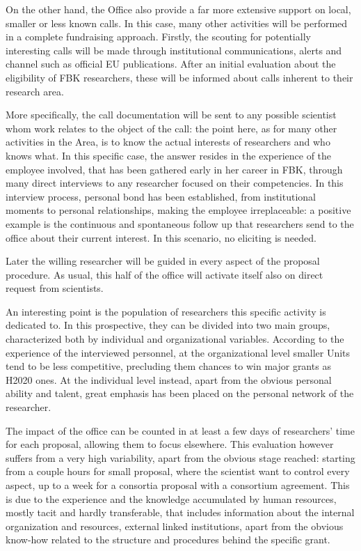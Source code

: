 On the other hand, the Office also provide a far more extensive support on local, smaller or less known calls. In this case, many other activities will be performed in a complete fundraising approach. Firstly, the scouting for potentially interesting calls will be made through institutional communications, alerts and channel such as official EU publications. After an initial evaluation about the eligibility of FBK researchers, these will be informed about calls inherent to their research area. 

More specifically, the call documentation will be sent to any possible scientist whom work relates to the object of the call: the point here, as for many other activities in the Area, is to know the actual interests of researchers and who knows what. In this specific case, the answer resides in the experience of the employee involved, that has been gathered early in her career in FBK, through many direct interviews to any researcher focused on their competencies. In this interview process, personal bond has been established, from institutional moments to personal relationships, making the employee irreplaceable: a positive example is the continuous and spontaneous follow up that researchers send to the office about their current interest. In this scenario, no eliciting is needed.

Later the willing researcher will be guided in every aspect of the proposal procedure. As usual, this half of the office will activate itself also on direct request from scientists. 

An interesting point is the population of researchers this specific activity is dedicated to. In this prospective, they can be divided into two main groups, characterized both by individual and organizational variables. According to the experience of the interviewed personnel, at the organizational level smaller Units tend to be less competitive, precluding them chances to win major grants as H2020 ones. At the individual level instead, apart from the obvious personal ability and talent, great emphasis has been placed on the personal network of the researcher. 

The impact of the office can be counted in at least a few days of researchers’ time for each proposal, allowing them to focus elsewhere. This evaluation however suffers from a very high variability, apart from the obvious stage reached: starting from a couple hours for small proposal, where the scientist want to control every aspect, up to a week for a consortia proposal with a consortium agreement. This is due to the experience and the knowledge accumulated by human resources, mostly tacit and hardly transferable, that includes information about the internal organization and resources, external linked institutions, apart from the obvious know-how related to the structure and procedures behind the specific grant. 

